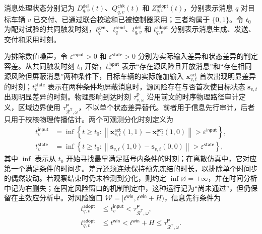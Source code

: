 \documentclass[10pt,a4paper,twocolumn]{article}
\newcommand{\revBlue}[1]{#1}
\begin{document}
\revBlue{消息处理状态分别记为 $D_{q,v}^{\mathsf{del}}(t)$、$Q_{q,v}^{\mathsf{chk}}(t)$ 和 $Z_{q,v}^{\mathsf{adopt}}(t)$，分别表示消息 $q$ 对目标车辆 $v$ 已交付、已通过联合校验和已被控制器采用；三者均属于 $\{0,1\}$。令 $t_0$ 为配对试验的共同触发时刻，$t_q^{\mathsf{gen}}$、$t_q^{\mathsf{send}}$、$t_{q,v}^{\mathsf{del}}$ 和 $t_{q,v}^{\mathsf{adopt}}$ 分别表示消息生成、发送、交付和采用时刻。}

为排除数值噪声，令 $\varepsilon^{\mathsf{input}}>0$ 和 $\varepsilon^{\mathsf{state}}>0$ 分别为实际输入差异和状态差异的判定容差。从共同触发时刻 $t_0$ 开始，$t_v^{\mathsf{input}}$ 表示“存在源风险且开放消息”和“存在相同源风险但屏蔽消息”两种条件下，目标车辆的实际施加输入 $\bm x_{v,t}^{\mathsf{act}}$ 首次出现明显差异的时刻；$t_v^{\mathsf{state}}$ 表示在两种条件均屏蔽消息时，源风险存在与否首次使目标状态 $\bm s_{v,t}$ 出现明显差异的时刻。物理影响到达时刻 $\tau_{v,\omega}^{\mathsf P}$ 沿用前文的时序物理路径审计定义，区域边界使用 $\tau_{\mathcal R^{\mathsf T},\omega}^{\mathsf P}$，不以单个状态差异替代。前者用于信息先行审计，后者只用于校核物理传播估计。两个可观测分化时刻定义为
\begin{equation}
\begin{aligned}
t_v^{\mathsf{input}}&=\inf\left\{t\geq t_0:\left\|\bm x_{v,t}^{\mathsf{act}}(1,1)-\bm x_{v,t}^{\mathsf{act}}(1,0)\right\|>\varepsilon^{\mathsf{input}}\right\},\\
t_v^{\mathsf{state}}&=\inf\left\{t\geq t_0:\left\|\bm s_{v,t}(1,0)-\bm s_{v,t}(0,0)\right\|>\varepsilon^{\mathsf{state}}\right\},
\end{aligned}
\end{equation}
其中 $\inf$ 表示从 $t_0$ 开始寻找最早满足括号内条件的时刻；在离散仿真中，它对应第一个满足条件的时间步。差异还须连续保持预先冻结的时长，以排除单个时间步的偶然波动。若观察结束时仍未检测到分化，则约定 $\inf\varnothing=+\infty$，并在时间分析中记为右删失；在固定风险窗口的机制判定中，这种运行记为“尚未通过”，但仍保留在主效应分析中。对风险窗口 $\mathcal W=[t^{\mathsf{win}},t^{\mathsf{win}}+H)$，信息先行条件为
\begin{equation}
\begin{aligned}
 t_{q,v}^{\mathsf{adopt}}&\leq t_v^{\mathsf{input}}<\tau_{\mathcal R^{\mathsf T},\omega}^{\mathsf P},\\
 t_{q,v}^{\mathsf{adopt}}&\leq t^{\mathsf{win}}<t^{\mathsf{win}}+H\leq\tau_{\mathcal R^{\mathsf T},\omega}^{\mathsf P}.
\end{aligned}
\end{equation}
\end{document}
